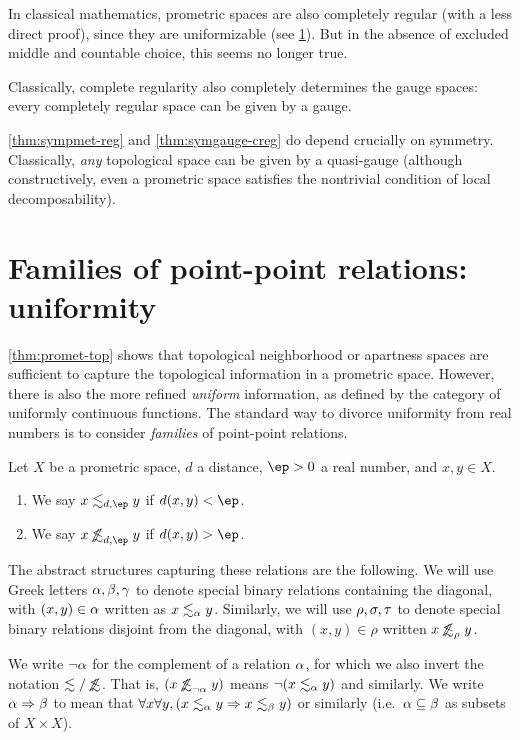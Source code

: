 \documentclass{article}
\def\oapt{\mathrel{\!\not\,\not\lesssim}}
\def\leapx{\lesssim}
\let\implies\Rightarrow
\begin{document}
In classical mathematics, prometric spaces are also completely regular (with a less direct proof), since they are uniformizable (see \cref{sec:uniformity}).
But in the absence of excluded middle and countable choice, this seems no longer true.

Classically, complete regularity also completely determines the gauge spaces: every completely regular space can be given by a gauge.

\cref{thm:sympmet-reg} and \cref{thm:symgauge-creg} do depend crucially on symmetry.
Classically, \emph{any} topological space can be given by a quasi-gauge (although constructively, even a prometric space satisfies the nontrivial condition of local decomposability).


\section{Families of point-point relations: uniformity}
\label{sec:uniformity}

\cref{thm:promet-top} shows that topological neighborhood or apartness spaces are sufficient to capture the topological information in a prometric space.
However, there is also the more refined \emph{uniform} information, as defined by the category of uniformly continuous functions.
The standard way to divorce uniformity from real numbers is to consider \emph{families} of point-point relations.

\begin{defn}\label{def:pmet-unif}
  Let $X$ be a prometric space, $d$ a distance, $\ep>0$ a real number, and $x,y\in X$.
  \begin{enumerate}
  \item We say $x \leapx_{d,\ep} y$ if $d(x,y)<\ep$.
  \item We say $x \oapt_{d,\ep} y$ if $d(x,y)>\ep$.
  \end{enumerate}
\end{defn}

The abstract structures capturing these relations are the following.
We will use Greek letters $\alpha,\beta,\gamma$ to denote special binary relations containing the diagonal, with $(x,y)\in \alpha$ written as $x\leapx_\al y$.
Similarly, we will use $\rho,\sigma,\tau$ to denote special binary relations disjoint from the diagonal, with $
(x,y)\in\rho$ written $x \oapt_\rho y$.

We write $\neg\alpha$ for the complement of a relation $\alpha$, for which we also invert the notation $\leapx/\oapt$.
That is, $(x \oapt_{\neg\al} y)$ means $\neg (x\leapx_{\al} y)$ and similarly.
We write $\al\implies\be$ to mean that $\forall x\forall y,(x\leapx_\al y \implies x\leapx_\be y)$ or similarly (i.e.\ $\alpha\subseteq \beta$ as subsets of $X\times X$).
\end{document}
